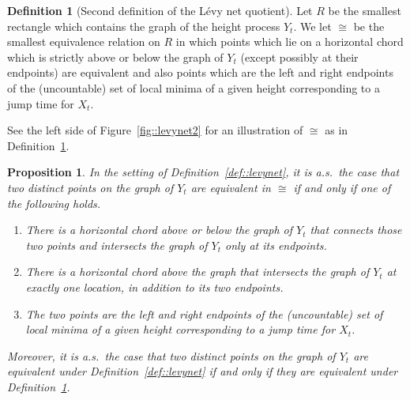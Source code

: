 \documentclass[JEP,XML,SOM,Unicode]{cedram}
\theoremstyle{plain}
\numberwithin{theorem}{section}
\newtheorem{proposition}[theorem]{Proposition}
\theoremstyle{definition}
\newtheorem{definition}[theorem]{Definition}
\begin{document}
\begin{definition}[Second definition of the Lévy net quotient]
\label{def::levynet2}
Let $R$ be the smallest rectangle which contains the graph of the height process $Y_t$. We let $\cong$ be the smallest equivalence relation on $R$ in which points which lie on a horizontal chord which is strictly above or below the graph of $Y_t$ (except possibly at their endpoints) are equivalent and also points which are the left and right endpoints of the (uncountable) set of local minima of a given height corresponding to a jump time for $X_t$.
\end{definition}
See the left side of Figure~\ref{fig::levynet2} for an illustration of $\cong$ as in Definition~\ref{def::levynet2}.

\begin{proposition}
\label{prop::graphplushorizchords}
In the setting of Definition~\ref{def::levynet}, it is a.s.\ the case that two distinct points on the graph of $Y_t$ are equivalent in $\cong$ if and only if one of the following holds.
\begin{enumerate}
\item\label{it:equiv1} There is a horizontal chord above or below the graph of $Y_t$ that connects those two points and intersects the graph of $Y_t$ only at its endpoints.
\item\label{it:equiv2} There is a horizontal chord above the graph that intersects the graph of $Y_t$ at exactly one location, in addition to its two endpoints.
\item\label{it:equiv3} The two points are the left and right endpoints of the (uncountable) set of local minima of a given height corresponding to a jump time for $X_t$.
\end{enumerate}
Moreover, it is a.s.\ the case that two distinct points on the graph of $Y_t$ are equivalent under Definition~\ref{def::levynet} if and only if they are equivalent under Definition~\ref{def::levynet2}.
\end{proposition}
\end{document}
